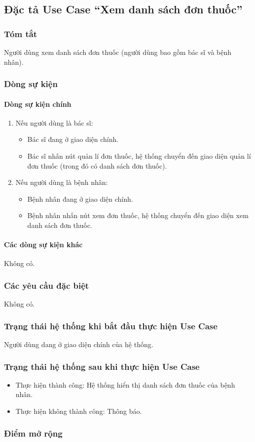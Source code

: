\subsection{Đặc tả Use Case ``Xem danh sách đơn thuốc''}

\subsubsection{Tóm tắt}
Người dùng xem danh sách đơn thuốc (người dùng bao gồm bác sĩ và bệnh nhân).

\subsubsection{Dòng sự kiện}
\paragraph{\textbf{Dòng sự kiện chính}}
\begin{enumerate}
  \item Nếu người dùng là bác sĩ:
    \begin{itemize}
      \item Bác sĩ đang ở giao diện chính.
      \item Bác sĩ nhấn nút quản lí đơn thuốc, hệ thống chuyển đến giao diện quản lí đơn thuốc (trong đó có danh sách đơn thuốc).
    \end{itemize}
  \item Nếu người dùng là bệnh nhân:
    \begin{itemize}
      \item Bệnh nhân đang ở giao diện chính.
      \item Bệnh nhân nhấn nút xem đơn thuốc, hệ thống chuyển đến giao diện xem danh sách đơn thuốc.
    \end{itemize}
\end{enumerate}

\paragraph{\textbf{Các dòng sự kiện khác}}
Không có.

\subsubsection{Các yêu cầu đặc biệt}
Không có.

\subsubsection{Trạng thái hệ thống khi bắt đầu thực hiện Use Case}
Người dùng dang ở giao diện chính của hệ thống.

\subsubsection{Trạng thái hệ thống sau khi thực hiện Use Case}
\begin{itemize}
  \item Thực hiện thành công: Hệ thống hiển thị danh sách đơn thuốc của bệnh nhân.
  \item Thực hiện không thành công: Thông báo.
\end{itemize}

\subsubsection{Điểm mở rộng}